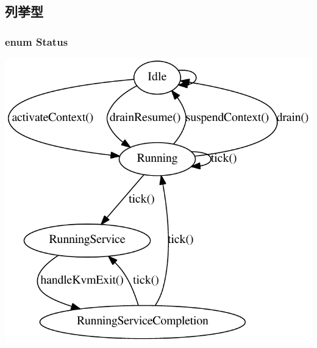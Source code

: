 \subsection{列挙型}
\hypertarget{classBaseKvmCPU_a67a0db04d321a74b7e7fcfd3f1a3f70b}{
\subsubsection[{Status}]{\setlength{\rightskip}{0pt plus 5cm}enum {\bf Status}}}
\label{classBaseKvmCPU_a67a0db04d321a74b7e7fcfd3f1a3f70b}
\begin{center}

\begin{DoxyImageNoCaption}
  \mbox{\includegraphics{inline_dotgraph_1}}
\end{DoxyImageNoCaption}
\end{center}
